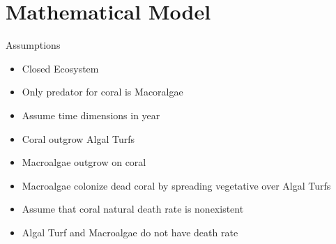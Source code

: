 \documentclass{beamer}
\begin{document}


\section{Mathematical Model} %

\begin{frame}{Assumptions}
    \begin{itemize}
        \item Closed Ecosystem
        \item Only predator for coral is Macoralgae
        \item Assume time dimensions in year
        \item Coral outgrow Algal Turfs
        \item Macroalgae outgrow on coral
        \item Macroalgae colonize dead coral by spreading vegetative over Algal Turfs
        \item Assume that coral natural death rate is nonexistent
        \item Algal Turf and Macroalgae do not have death rate
    \end{itemize}
\end{frame}
\end{document}
